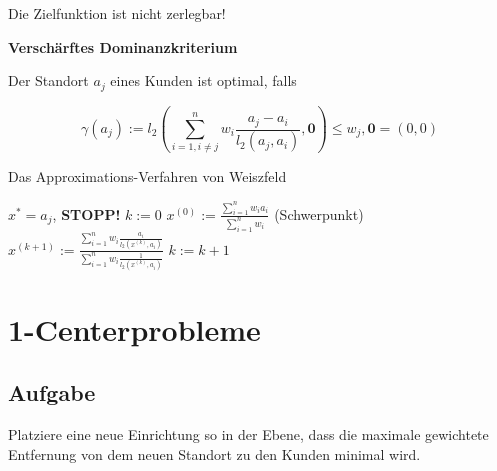       \par Die Zielfunktion ist nicht zerlegbar!

      \par \textbf{Verschärftes Dominanzkriterium}

      \par Der Standort $a_j$ eines Kunden ist optimal, falls

      \begin{equation}
        \gamma(a_j) := l_2(\sum_{i=1, i \neq j}^{n} w_i \frac{a_j - a_i}{l_2(a_j, a_i)}, \mathbf{0}) \leq w_j, \mathbf{0} = (0, 0)
      \end{equation}


      \begin{algorithm}[htbp]
        \caption{Das Approximations-Verfahren von Weiszfeld}
        \begin{algorithmic}[1]
            \State $x^* = a_j$, \textbf{STOPP!}
          \Else
            \State $k:=0$
            \State $x^{(0)}:=\frac{\sum_{i=1}^{n}w_ia_i}{\sum_{i=1}^{n}w_i}$ (Schwerpunkt)
              \State $x^{(k+1)} := \frac{\sum_{i=1}^{n}w_i\frac{a_i}{l_2(x^{(k)}, a_i)}}{\sum_{i=1}^{n}w_i\frac{1}{l_2(x^{(k)}, a_i)}}$
              \State $k:=k+1$
            \EndWhile
          \EndIf
        \end{algorithmic}
      \end{algorithm}

          
  

  \section{1-Centerprobleme} %
  \label{sec:1_centerprobleme}

    \subsection{Aufgabe} %
    \label{sub:aufgabe}

      Platziere eine neue Einrichtung so in der Ebene, dass die maximale gewichtete Entfernung von dem neuen Standort zu den Kunden minimal wird.
    
